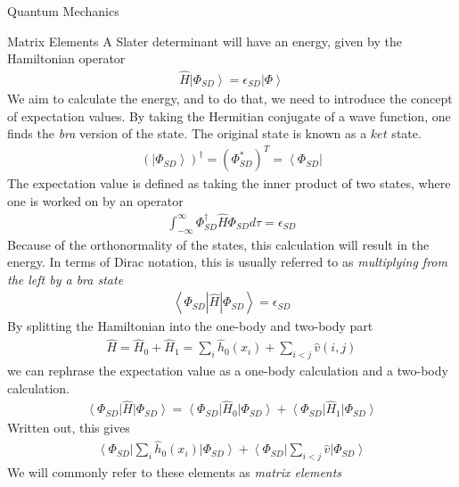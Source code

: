 \documentclass[twoside,english]{uiofysmaster}
\begin{document}
\begin{chapter}{Quantum Mechanics}
	\begin{section}{Matrix Elements}
		A Slater determinant will have an energy, given by the Hamiltonian operator
		\begin{align}
			\hat H \left| \Phi_{SD} \right> = \epsilon_{SD} \left| \Phi \right>
		\end{align}
		We aim to calculate the energy, and to do that, we need to introduce the concept of expectation values. By taking the Hermitian conjugate of a wave function, one finds the \textit{bra} version of the state. The original state is known as a $ket$ state. 
		\begin{align}
			\left( \left| \Phi_{SD} \right> \right)^\dagger = \left( \Phi_{SD}^* \right)^T = \left< \Phi_{SD} \right| 
		\end{align}
		The expectation value is defined as taking the inner product of two states, where one is worked on by an operator
		\begin{align}
			\int_{-\infty}^\infty \Phi_{SD}^\dagger \hat H \Phi_{SD} d \tau = \epsilon_{SD}
		\end{align}
		Because of the orthonormality of the states, this calculation will result in the energy. In terms of Dirac notation, this is usually referred to as \textit{multiplying from the left by a bra state}
		\begin{align}
			\left< \Phi_{SD} | \hat H | \Phi_{SD} \right> = \epsilon_{SD}
		\end{align}
		By splitting the Hamiltonian into the one-body and two-body part
		\begin{align}
			\hat H = \hat H_0 + \hat H_1 = \sum_i \hat h_0(x_i) + \sum_{i<j} \hat v(i,j)
		\end{align}
		we can rephrase the expectation value as a one-body calculation and a two-body calculation. 
		\begin{align}
			\left< \Phi_{SD} \right| \hat H \left| \Phi_{SD} \right> = \left< \Phi_{SD} \right| \hat H_0 \left| \Phi_{SD} \right> + \left< \Phi_{SD} \right| \hat H_1 \left| \Phi_{SD} \right>
		\end{align}
		Written out, this gives 
		\begin{align}
			\left< \Phi_{SD} \right| \sum_i \hat h_0(x_i) \left| \Phi_{SD} \right> + \left< \Phi_{SD} \right| \sum_{i<j} \hat v \left| \Phi_{SD} \right>
		\end{align}
		We will commonly refer to these elements as \textit{matrix elements}


\end{section}
\end{chapter}
\end{document}
